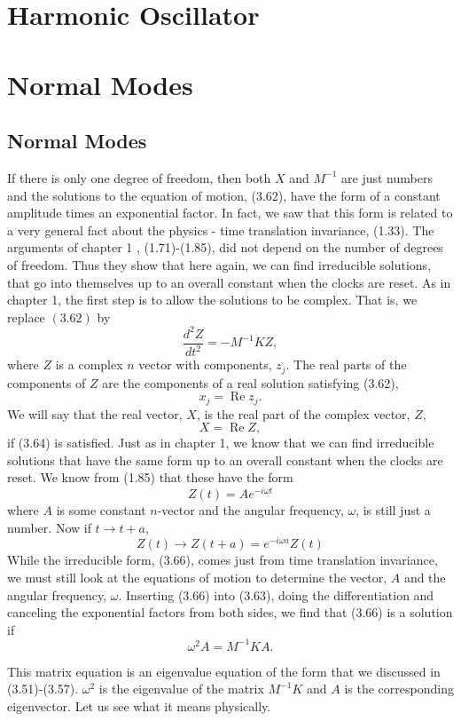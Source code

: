 \documentclass[main.tex]{subfiles}
\begin{document}
\chapter{Harmonic Oscillator}


\chapter{Normal Modes}
\section{Normal Modes}
If there is only one degree of freedom, then both $X$ and $M^{-1}$ are just numbers and the solutions to the equation of motion, (3.62), have the form of a constant amplitude times an exponential factor. In fact, we saw that this form is related to a very general fact about the physics - time translation invariance, (1.33). The arguments of chapter 1 , (1.71)-(1.85), did not depend on the number of degrees of freedom. Thus they show that here again, we can find irreducible solutions, that go into themselves up to an overall constant when the clocks are reset. As in chapter 1, the first step is to allow the solutions to be complex. That is, we replace $(3.62)$ by
$$
\frac{d^2 Z}{d t^2}=-M^{-1} K Z,
$$
where $Z$ is a complex $n$ vector with components, $z_j$. The real parts of the components of $Z$ are the components of a real solution satisfying (3.62),
$$
x_j=\operatorname{Re} z_j .
$$
We will say that the real vector, $X$, is the real part of the complex vector, $Z$,
$$
X=\operatorname{Re} Z,
$$
if (3.64) is satisfied.
Just as in chapter 1, we know that we can find irreducible solutions that have the same form up to an overall constant when the clocks are reset. We know from (1.85) that these have the form
$$
Z(t)=A e^{-i \omega t}
$$
where $A$ is some constant $n$-vector and the angular frequency, $\omega$, is still just a number. Now if $t \rightarrow t+a$,
$$
Z(t) \rightarrow Z(t+a)=e^{-i \omega a} Z(t)
$$
While the irreducible form, (3.66), comes just from time translation invariance, we must still look at the equations of motion to determine the vector, $A$ and the angular frequency, $\omega$. Inserting (3.66) into (3.63), doing the differentiation and canceling the exponential factors from both sides, we find that (3.66) is a solution if
\begin{equation}
    \label{eq:normal_mode_eigen_value_equation}
\omega^2 A=M^{-1} K A .
\end{equation}

This matrix equation is an eigenvalue equation of the form that we discussed in (3.51)-(3.57). $\omega^2$ is the eigenvalue of the matrix $M^{-1} K$ and $A$ is the corresponding eigenvector. Let us see what it means physically.
\end{document}
